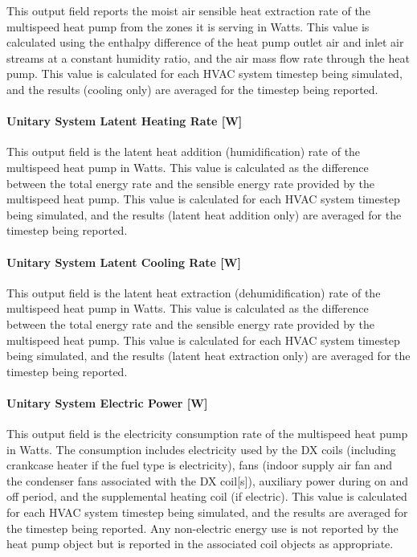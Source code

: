 This output field reports the moist air sensible heat extraction rate of the multispeed heat pump from the zones it is serving in Watts. This value is calculated using the enthalpy difference of the heat pump outlet air and inlet air streams at a constant humidity ratio, and the air mass flow rate through the heat pump. This value is calculated for each HVAC system timestep being simulated, and the results (cooling only) are averaged for the timestep being reported.

\paragraph{Unitary System Latent Heating Rate {[}W{]}}\label{unitary-system-latent-heating-rate-w-1}

This output field is the latent heat addition (humidification) rate of the multispeed heat pump in Watts. This value is calculated as the difference between the total energy rate and the sensible energy rate provided by the multispeed heat pump. This value is calculated for each HVAC system timestep being simulated, and the results (latent heat addition only) are averaged for the timestep being reported.

\paragraph{Unitary System Latent Cooling Rate {[}W{]}}\label{unitary-system-latent-cooling-rate-w-1}

This output field is the latent heat extraction (dehumidification) rate of the multispeed heat pump in Watts. This value is calculated as the difference between the total energy rate and the sensible energy rate provided by the multispeed heat pump. This value is calculated for each HVAC system timestep being simulated, and the results (latent heat extraction only) are averaged for the timestep being reported.

\paragraph{Unitary System Electric Power {[}W{]}}\label{unitary-system-electric-power-w-1}

This output field is the electricity consumption rate of the multispeed heat pump in Watts. The consumption includes electricity used by the DX coils (including crankcase heater if the fuel type is electricity), fans (indoor supply air fan and the condenser fans associated with the DX coil{[}s{]}), auxiliary power during on and off period, and the supplemental heating coil (if electric). This value is calculated for each HVAC system timestep being simulated, and the results are averaged for the timestep being reported. Any non-electric energy use is not reported by the heat pump object but is reported in the associated coil objects as appropriate.

